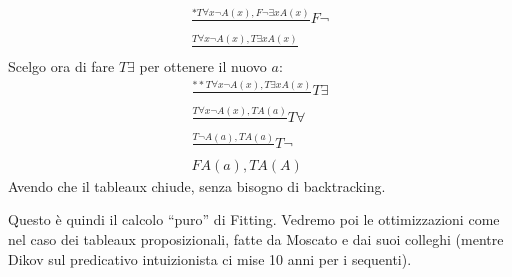 \documentclass[a4paper,12pt, oneside]{book}
\begin{document}
\begin{esempio}
  \begin{gather*}
    \frac{*T\forall x\neg A(x), F\neg\exists x A(x)}{}F\neg\\
    \frac{T\forall x\neg A(x), T\exists xA(x)}{}
  \end{gather*}
  Scelgo ora di fare $T\exists$ per ottenere il nuovo $a$:
  \begin{gather*}
    \frac{**T\forall x\neg A(x), T\exists xA(x)}{}T\exists\\
    \frac{T\forall x\neg A(x), TA(a)}{}T\forall\\
    \frac{T\neg A(a), TA(a)}{}T\neg\\
    FA(a), TA(A)
  \end{gather*}
  Avendo che il tableaux chiude, senza bisogno di backtracking.
\end{esempio}
Questo è quindi il calcolo ``puro'' di Fitting. Vedremo poi le ottimizzazioni
come nel caso dei tableaux proposizionali, fatte da Moscato e dai suoi colleghi
(mentre Dikov sul predicativo intuizionista ci mise 10 anni per i sequenti).\\
\end{document}
